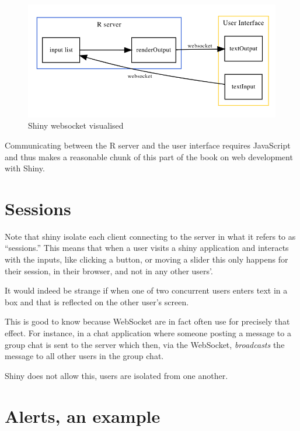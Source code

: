 \documentclass[10pt,]{krantz}
\begin{document}
\begin{figure}[H]

{\centering \includegraphics[width=1\linewidth]{images/04-shiny-websocket} 

}

\caption{Shiny websocket visualised}\label{fig:shiny-websocket-diagram}
\end{figure}

Communicating between the R server and the user interface requires JavaScript and thus makes a reasonable chunk of this part of the book on web development with Shiny.

\hypertarget{shiny-intro-sessions}{%
\section{Sessions}\label{shiny-intro-sessions}}

Note that shiny isolate each client connecting to the server in what it refers to as ``sessions.'' This means that when a user visits a shiny application and interacts with the inputs, like clicking a button, or moving a slider this only happens for their session, in their browser, and not in any other users'.

It would indeed be strange if when one of two concurrent users enters text in a box and that is reflected on the other user's screen.

This is good to know because WebSocket are in fact often use for precisely that effect. For instance, in a chat application where someone posting a message to a group chat is sent to the server which then, via the WebSocket, \emph{broadcasts} the message to all other users in the group chat.

Shiny does not allow this, users are isolated from one another.

\hypertarget{shiny-intro-example}{%
\section{Alerts, an example}\label{shiny-intro-example}}
\end{document}

